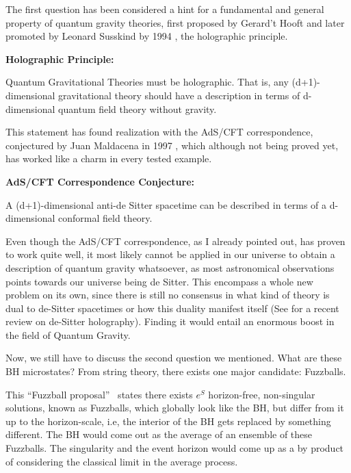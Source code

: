 \documentclass[11pt,a4paper]{article}
\begin{document}
The first question has been considered a hint for a fundamental and general property of quantum gravity theories, first proposed by Gerard't Hooft and later promoted by Leonard Susskind by 1994 \cite{Susskind_1995}, the holographic principle.

\begin{boxedminipage}{0.9\textwidth}
    \textbf{Holographic Principle: }
    
    Quantum Gravitational Theories must be holographic. That is, any (d+1)-dimensional gravitational theory should have a description in terms of d-dimensional quantum field theory without gravity.
\end{boxedminipage}

This statement has found realization with the AdS/CFT correspondence, conjectured by Juan Maldacena in 1997 \cite{Maldacena_1999}, which although not being proved yet, has worked like a charm in every tested example.

\begin{boxedminipage}{0.9\textwidth}
    \textbf{AdS/CFT Correspondence Conjecture: }
    
    A (d+1)-dimensional anti-de Sitter spacetime can be described in terms of a d-dimensional conformal field theory.
\end{boxedminipage}

Even though the AdS/CFT correspondence, as I already pointed out, has proven to work quite well, it most likely cannot be applied in our universe to obtain a description of quantum gravity whatsoever, as most astronomical observations points towards our universe being de Sitter. This encompass a whole new problem on its own, since there is still no consensus in what kind of theory is dual to de-Sitter spacetimes or how this duality manifest itself (See \cite{Galante:2023uyf} for a recent review on de-Sitter holography). Finding it would entail an enormous boost in the field of Quantum Gravity.

Now, we still have to discuss the second question we mentioned. What are these BH microstates? From string theory, there exists one major candidate: Fuzzballs. 

This \textquotedblleft Fuzzball proposal\textquotedblright~ states there exists $e^{S}$ horizon-free, non-singular solutions, known as Fuzzballs, which globally look like the BH, but differ from it up to the horizon-scale, i.e, the interior of the BH gets replaced by something different. The BH would come out as the average of an ensemble of these Fuzzballs. The singularity and the event horizon would come up as a by product of considering the classical limit in the average process.
\end{document}
